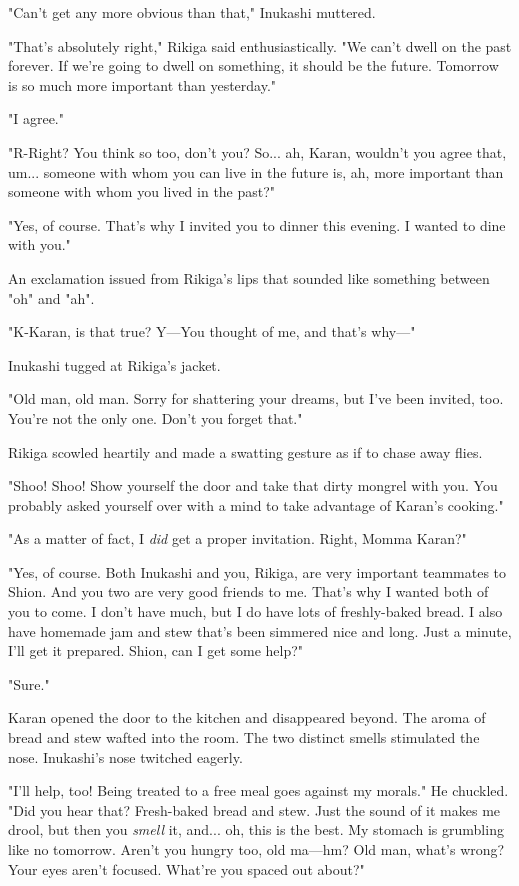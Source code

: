 "Can't get any more obvious than that," Inukashi muttered.

"That's absolutely right," Rikiga said enthusiastically. "We can't dwell
on the past forever. If we're going to dwell on something, it should be
the future. Tomorrow is so much more important than yesterday."

"I agree."

"R-Right? You think so too, don't you? So... ah, Karan, wouldn't you
agree that, um... someone with whom you can live in the future is, ah,
more important than someone with whom you lived in the past?"

"Yes, of course. That's why I invited you to dinner this evening. I
wanted to dine with you."

An exclamation issued from Rikiga's lips that sounded like something
between "oh" and "ah".

"K-Karan, is that true? Y---You thought of me, and that's why---"

Inukashi tugged at Rikiga's jacket.

"Old man, old man. Sorry for shattering your dreams, but I've been
invited, too. You're not the only one. Don't you forget that."

Rikiga scowled heartily and made a swatting gesture as if to chase away
flies.

"Shoo! Shoo! Show yourself the door and take that dirty mongrel with
you. You probably asked yourself over with a mind to take advantage of
Karan's cooking."

"As a matter of fact, I \emph{did} get a proper invitation. Right, Momma
Karan?"

"Yes, of course. Both Inukashi and you, Rikiga, are very important
teammates to Shion. And you two are very good friends to me. That's why
I wanted both of you to come. I don't have much, but I do have lots of
freshly-baked bread. I also have homemade jam and stew that's been
simmered nice and long. Just a minute, I'll get it prepared. Shion, can
I get some help?"

"Sure."

Karan opened the door to the kitchen and disappeared beyond. The aroma
of bread and stew wafted into the room. The two distinct smells
stimulated the nose. Inukashi's nose twitched eagerly.

"I'll help, too! Being treated to a free meal goes against my morals."
He chuckled. "Did you hear that? Fresh-baked bread and stew. Just the
sound of it makes me drool, but then you \emph{smell} it, and... oh, this is
the best. My stomach is grumbling like no tomorrow. Aren't you hungry
too, old ma---hm? Old man, what's wrong? Your eyes aren't focused. What're
you spaced out about?"

